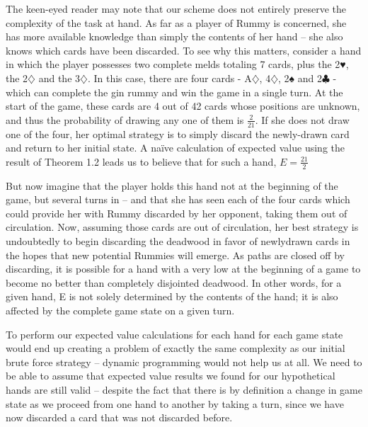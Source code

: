 \documentclass[paper=a4, fontsize=11pt,twoside]{report}   %
\begin{document}
The keen-eyed reader may note that our scheme does not entirely preserve the complexity of the task at hand. As far as a player of Rummy is concerned, she has more available knowledge than simply the contents of her hand – she also knows which cards have been discarded. To see why this matters, consider a hand in which the player possesses two complete melds totaling 7 cards, plus the 2♥, the 2$\diamondsuit$ and the 3$\diamondsuit$. In this case, there are four cards - A$\diamondsuit$, 4$\diamondsuit$, 2♠ and 2$\clubsuit$ - which can complete the gin rummy and win the game in a single turn. At the start of the game, these cards are 4 out of 42 cards whose positions are unknown, and thus the probability of drawing any one of them is $\frac{2}{21}$. If she does not draw one of the four, her optimal strategy is to simply discard the newly-drawn card and return to her initial state. A naïve calculation of expected value using the result of Theorem 1.2 leads us to believe that for such a hand, $E=\frac{21}{2}$
 
 But now imagine that the player holds this hand not at the beginning of the game, but several turns in – and that she has seen each of the four cards which could provide her with Rummy discarded by her opponent, taking them out of circulation. Now, assuming those cards are out of circulation, her best strategy is undoubtedly to begin discarding the deadwood in favor of newlydrawn cards in the hopes that new potential Rummies will emerge. As paths are closed off by discarding, it is possible for a hand with a very low  at the beginning of a game to become no better than completely disjointed deadwood. In other words, for a given hand, E is not solely determined by the contents of the hand; it is also affected by the complete game state on a given turn. 
 
 To perform our expected value calculations for each hand for each game state would end up creating a problem of exactly the same complexity as our initial brute force strategy – dynamic programming would not help us at all. We need to be able to assume that expected value results we found for our hypothetical hands are still valid – despite the fact that there is by definition a change in game state as we proceed from one hand to another by taking a turn, since we have now discarded a card that was not discarded before. 
\end{document}
